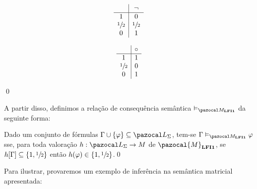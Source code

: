 \begin{definicao}
            \vspace{0.5cm}

            \begin{minipage}{0.4\textwidth}
                \[
                    \begin{array}{c|c}%
                                    & \neg        \\
                        \hline%
                        1           & 0           \\
                        \meio{} & \meio{} \\
                        0           & 1           \\
                    \end{array}
                \]
            \end{minipage}
            \begin{minipage}{0.3\textwidth}
                \[
                    \begin{array}{c|c}%
                                    & \circ   \\
                        \hline%
                        1           & 1         \\
                        \meio{} & 0         \\
                        0           & 1         \\
                    \end{array}
                \]
            \end{minipage}

            \vspace{\baselineskip}
            \qed{}
        \end{definicao}

        A partir disso, definimos a relação de consequência semântica $\conmat$ da seguinte forma:

        \begin{definicao}
            Dado um conjunto de fórmulas $\Gamma \cup \{\phi\} \subseteq \ling{}$, tem-se $\Gamma \conmat \phi$ sse, para toda valoração $h : \ling{} \to M$ de $\pazocal{M}_{\lfium{}}$, se $h[\Gamma] \subseteq \{1, \sfrac{1}{2}{}\}$ então $h(\varphi) \in \{1, \sfrac{1}{2}{}\}$.\qed{}
        \end{definicao}
        Para ilustrar, provaremos um exemplo de inferência na semântica matricial apresentada:

